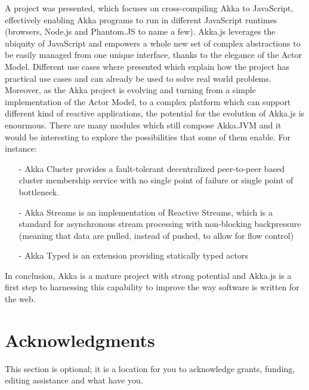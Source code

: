 \documentclass{sig-alternate}
\begin{document}
A project was presented, which focuses on cross-compiling Akka to JavaScript, effectively enabling Akka programs to run in different 
JavaScript runtimes (browsers, Node.js and Phantom.JS to name a few).
Akka.js leverages the ubiquity of JavaScript and empowers a whole new set of complex abstractions to be easily managed from one
unique interface, thanks to the elegance of the Actor Model. Different use cases where presented which explain how the project
has practical use cases and can already be used to solve real world problems.
Moreover, as the Akka project is evolving and turning from a simple implementation of the Actor Model, to a complex platform
which can support different kind of reactive applications, the potential for the evolution of Akka.js is enourmous.
There are many modules which still compose Akka.JVM and it would be interesting to explore the possibilities that some of them
enable. For instance:
\begin{itemize}
\item[-] Akka Cluster provides a fault-tolerant decentralized peer-to-peer based cluster membership service with no single point of failure or single point of bottleneck.
\item[-] Akka Streams is an implementation of Reactive Streams, which is a standard for asynchronous stream processing with non-blocking backpressure (meaning that data 
are pulled, instead of pushed, to allow for flow control)
\item[-] Akka Typed is an extension providing statically typed actors
\end{itemize}
In conclusion, Akka is a mature project with strong potential and Akka.js is a first step to harnessing this capability to 
improve the way software is written for the web.


\section{Acknowledgments}
This section is optional; it is a location for you
to acknowledge grants, funding, editing assistance and
what have you.

%

%
%

\end{document}
